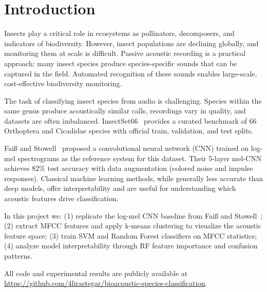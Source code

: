 
\section{Introduction}\label{sec:introduction}

Insects play a critical role in ecosystems as pollinators, decomposers, and indicators of biodiversity.
However, insect populations are declining globally, and monitoring them at scale is difficult.
Passive acoustic recording is a practical approach: many insect species produce species-specific sounds that can be captured in the field.
Automated recognition of these sounds enables large-scale, cost-effective biodiversity monitoring.

The task of classifying insect species from audio is challenging.
Species within the same genus produce acoustically similar calls, recordings vary in quality, and datasets are often imbalanced.
InsectSet66~\cite{insectset66zenodo} provides a curated benchmark of 66 Orthoptera and Cicadidae species with official train, validation, and test splits.

Fai\ss{} and Stowell~\cite{faiss2023adaptive} proposed a convolutional neural network (CNN) trained on log-mel spectrograms as the reference system for this dataset.
Their 5-layer mel-CNN achieves 82\% test accuracy with data augmentation (colored noise and impulse responses).
Classical machine learning methods, while generally less accurate than deep models, offer interpretability and are useful for understanding which acoustic features drive classification.

In this project we:
(1) replicate the log-mel CNN baseline from Fai\ss{} and Stowell~\cite{faiss2023adaptive};
(2) extract MFCC features and apply k-means clustering to visualize the acoustic feature space;
(3) train SVM and Random Forest classifiers on MFCC statistics;
(4) analyze model interpretability through RF feature importance and confusion patterns.

All code and experimental results are publicly available at \url{https://github.com/4lirastegar/bioacoustic-species-classification}.
